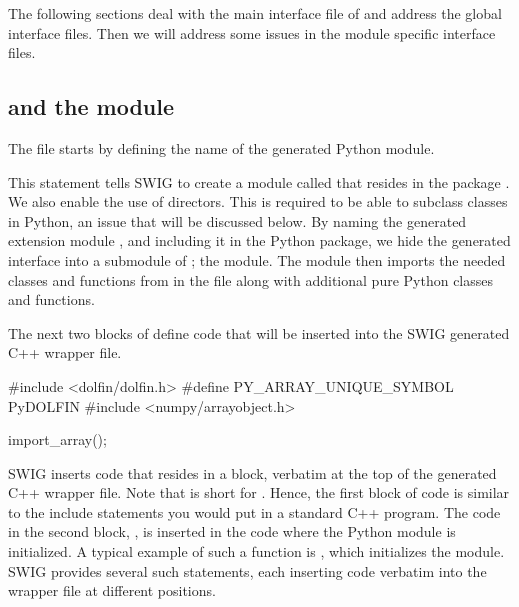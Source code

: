 The following sections deal with the main interface file of 
and address the global interface files. Then we will address some issues
in the module specific interface files.

\vspace*{3pt}
\subsection{ and the  module}

The file  starts by defining the name of the generated
Python module.\vspace*{2pt}
\begin{swigcode}
\end{swigcode}

\vspace*{3pt}

\noindent This statement tells SWIG to create a module called  that
resides in the package \dolfin{}. We also enable the use of
directors.  This is required to be able to subclass \dolfin classes
in Python, an issue that will be discussed below.  By naming the generated
extension module , and including it in the \dolfin{} Python
package, we hide the generated interface into a submodule of \dolfin{}; the
 module.  The \dolfin{} module then imports the needed
classes and functions from  in the 
file along with additional pure Python classes and functions.

The next two blocks of  define code that will be inserted
into the SWIG generated C++ wrapper file.\vspace*{2pt}
\begin{swigcode}
#include <dolfin/dolfin.h>
#define PY_ARRAY_UNIQUE_SYMBOL PyDOLFIN
#include <numpy/arrayobject.h>

import_array();
\end{swigcode}

\vspace*{3pt}

\noindent SWIG inserts code that resides in a \emp{\%\{$\ldots$\%\}} block,
verbatim at the top of the generated C++ wrapper file. Note that
\emp{\%\{$\ldots$\%\}} is short for . Hence,
the first block of code is similar to the include statements you
would put in a standard C++ program. The code in the second block,
, is inserted in the code where the
Python module is initialized. A typical example of such a function is
, which initializes the \numpy module. SWIG provides
several such statements, each inserting code verbatim into the wrapper
file at different positions.

